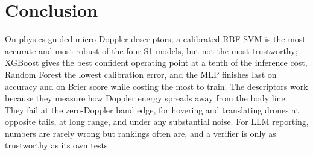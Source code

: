 \documentclass[conference]{IEEEtran}
\begin{document}
\section{Conclusion}
On physics-guided micro-Doppler descriptors, a calibrated RBF-SVM is the most accurate and most robust of the four S1 models, but not the most trustworthy; XGBoost gives the best confident operating point at a tenth of the inference cost, Random Forest the lowest calibration error, and the MLP finishes last on accuracy and on Brier score while costing the most to train. The descriptors work because they measure how Doppler energy spreads away from the body line. They fail at the zero-Doppler band edge, for hovering and translating drones at opposite tails, at long range, and under any substantial noise. For LLM reporting, numbers are rarely wrong but rankings often are, and a verifier is only as trustworthy as its own tests.
\end{document}
